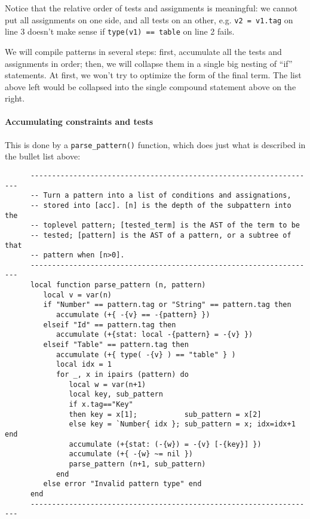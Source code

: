 Notice that the relative order of tests and assignments is meaningful:
we cannot put all assignments on one side, and all tests on an
other, e.g. \verb|v2 = v1.tag| on line 3 doesn't make sense if
\verb|type(v1) == table| on line 2 fails.

We will compile patterns in several steps: first, accumulate all the
tests and assignments in order; then, we will collapse them in a
single big nesting of ``if'' statements. At first, we won't try
to optimize the form of the final term. The list above left would be
collapsed into the single compound statement above on the right.

\paragraph{Accumulating constraints and tests}
This is done by a \verb|parse_pattern()| function, which does just what
is described in the bullet list above:

\begin{verbatim}
      -------------------------------------------------------------------
      -- Turn a pattern into a list of conditions and assignations,
      -- stored into [acc]. [n] is the depth of the subpattern into the
      -- toplevel pattern; [tested_term] is the AST of the term to be 
      -- tested; [pattern] is the AST of a pattern, or a subtree of that
      -- pattern when [n>0].
      -------------------------------------------------------------------
      local function parse_pattern (n, pattern)
         local v = var(n)
         if "Number" == pattern.tag or "String" == pattern.tag then
            accumulate (+{ -{v} == -{pattern} })
         elseif "Id" == pattern.tag then
            accumulate (+{stat: local -{pattern} = -{v} })
         elseif "Table" == pattern.tag then
            accumulate (+{ type( -{v} ) == "table" } )
            local idx = 1
            for _, x in ipairs (pattern) do
               local w = var(n+1)
               local key, sub_pattern
               if x.tag=="Key" 
               then key = x[1];           sub_pattern = x[2]
               else key = `Number{ idx }; sub_pattern = x; idx=idx+1 end
               accumulate (+{stat: (-{w}) = -{v} [-{key}] })
               accumulate (+{ -{w} ~= nil })
               parse_pattern (n+1, sub_pattern)
            end
         else error "Invalid pattern type" end
      end
      -------------------------------------------------------------------
\end{verbatim}

